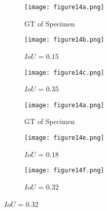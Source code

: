 \begin{figure} [!h]
	\centering
	\begin{subfigure}[b]{0.32\textwidth}
		\centering
		\texttt{[image: figure14a.png]}
		\caption{GT of Specimen~}
		\label{fig:gt_specimen_2}
	\end{subfigure}
	\hfill
	\begin{subfigure}[b]{0.32\textwidth}
		\centering
		\texttt{[image: figure14b.png]}
		\caption{\(IoU\) = \(0.15\)} 
		\label{fig:L3_S2_B_saeed}
	\end{subfigure}
	\hfill
	\begin{subfigure}[b]{0.32\textwidth}
		\centering
		\texttt{[image: figure14c.png]}
		\caption{\(IoU\) = \(0.35\)} 
		\label{fig:L3_S2_B_ijjeh}
	\end{subfigure}
	\par\medskip
	\begin{subfigure}[b]{0.32\textwidth}
		\centering
		\texttt{[image: figure14a.png]}
		\caption{GT of Specimen~}
		\label{fig:gt_specimen_3}
	\end{subfigure}
	\hfill
	\begin{subfigure}[b]{0.32\textwidth}
		\centering
		\texttt{[image: figure14e.png]}
		\caption{\(IoU\) = \(0.18\)} 
		\label{fig:L3_S3_B_saeed}
	\end{subfigure}
	\hfill
	\begin{subfigure}[b]{0.32\textwidth}
		\centering
		\texttt{[image: figure14f.png]}
		\caption{\(IoU\) = \(0.32\)} 
		\label{fig:L3_S3_B_ijjeh}
	\end{subfigure}

\end{figure}
